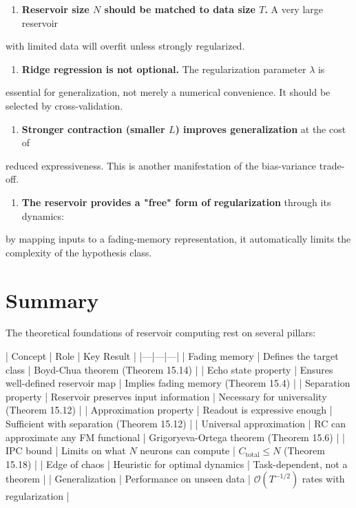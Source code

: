 \begin{enumerate}[nosep]
  \item \textbf{Reservoir size $N$ should be matched to data size $T$.} A very large reservoir
\end{enumerate}
   with limited data will overfit unless strongly regularized.

\begin{enumerate}[nosep]
  \item \textbf{Ridge regression is not optional.} The regularization parameter $\lambda$ is
\end{enumerate}
   essential for generalization, not merely a numerical convenience. It should be
   selected by cross-validation.

\begin{enumerate}[nosep]
  \item \textbf{Stronger contraction (smaller $L$) improves generalization} at the cost of
\end{enumerate}
   reduced expressiveness. This is another manifestation of the bias-variance trade-off.

\begin{enumerate}[nosep]
  \item \textbf{The reservoir provides a "free" form of regularization} through its dynamics:
\end{enumerate}
   by mapping inputs to a fading-memory representation, it automatically limits the
   complexity of the hypothesis class.


\bigskip


\section{Summary}\label{sec:15.9}

The theoretical foundations of reservoir computing rest on several pillars:

| Concept | Role | Key Result |
|---|---|---|
| Fading memory | Defines the target class | Boyd-Chua theorem (Theorem 15.14) |
| Echo state property | Ensures well-defined reservoir map | Implies fading memory (Theorem 15.4) |
| Separation property | Reservoir preserves input information | Necessary for universality (Theorem 15.12) |
| Approximation property | Readout is expressive enough | Sufficient with separation (Theorem 15.12) |
| Universal approximation | RC can approximate any FM functional | Grigoryeva-Ortega theorem (Theorem 15.6) |
| IPC bound | Limits on what $N$ neurons can compute | $C_{\text{total}} \leq N$ (Theorem 15.18) |
| Edge of chaos | Heuristic for optimal dynamics | Task-dependent, not a theorem |
| Generalization | Performance on unseen data | $\mathcal{O}(T^{-1/2})$ rates with regularization |

